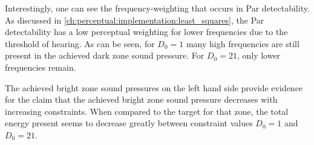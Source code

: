 Interestingly, one can see the frequency-weighting that occurs in Par detectability.
As discussed in \autoref{ch:perceptual:implementation:least_squares}, the Par detectability has a low perceptual weighting 
for lower frequencies due to the threshold of hearing.
As can be seen, for $D_0 = 1$ many high frequencies are still present in the achieved dark zone sound pressure.
For $D_0=21$, only lower frequencies remain. 

The achieved bright zone sound pressures on the left hand side provide evidence for the claim that the 
achieved bright zone sound pressure decreases with increasing constraints.
When compared to the target for that zone, the total energy present seems to decrease greatly between 
constraint values $D_0=1$ and $D_0=21$.  
